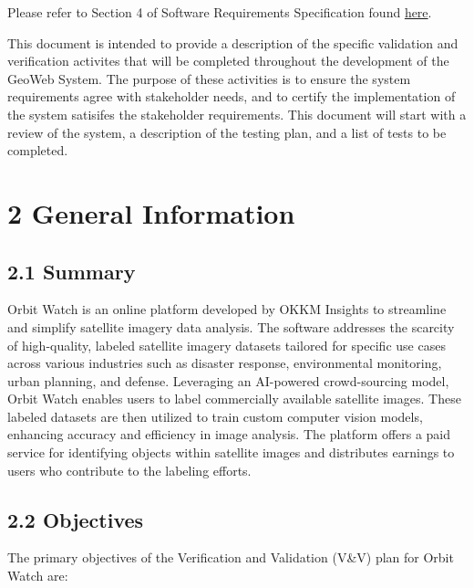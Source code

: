 \documentclass[12pt, titlepage]{article}
\begin{document}
Please refer to Section 4 of Software Requirements Specification found \href{https://github.com/OKKM-insights/OKKM.insights/blob/main/docs/SRS/SRS.pdf}{here}.







\newpage


This document is intended to provide a description of the specific validation and verification activites that will be completed throughout the development of the GeoWeb System.
The purpose of these activities is to ensure the system requirements agree with stakeholder needs, and to certify the implementation of the system satisifes the stakeholder requirements. This document will
start with a review of the system, a description of the testing plan, and a list of tests to be completed.


  \section{2 General Information}

  \subsection{2.1 Summary} \cite{Problem_Statement}
  
  Orbit Watch is an online platform developed by OKKM Insights to streamline and simplify satellite imagery data analysis. The software addresses the scarcity of high-quality, labeled satellite imagery datasets tailored for specific use cases across various industries such as disaster response, environmental monitoring, urban planning, and defense. Leveraging an AI-powered crowd-sourcing model, Orbit Watch enables users to label commercially available satellite images. These labeled datasets are then utilized to train custom computer vision models, enhancing accuracy and efficiency in image analysis. The platform offers a paid service for identifying objects within satellite images and distributes earnings to users who contribute to the labeling efforts.
  
  \subsection{2.2 Objectives} \cite{Problem_Statement}
  
  The primary objectives of the Verification and Validation (V\&V) plan for Orbit Watch are:
  
\end{document}
